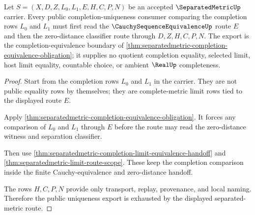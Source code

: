 \begin{theorem}
\label{thm:separatedmetric-public-completion-uniqueness-export}
Let $S=(X,D,Z,L_0,L_1,E,H,C,P,N)$ be an accepted $\SeparatedMetricUp$ carrier. Every public completion-uniqueness consumer comparing the completion rows $L_0$ and $L_1$ must first read the $\CauchySequenceEquivalenceUp$ route $E$ and then the zero-distance classifier route through $D,Z,H,C,P,N$. The export is the completion-equivalence boundary of \autoref{thm:separatedmetric-completion-equivalence-obligation}; it supplies no quotient completion equality, selected limit, host limit equality, countable choice, or ambient $\RealUp$ completeness.
\end{theorem}
\begin{proof}
Start from the completion rows $L_0$ and $L_1$ in the carrier. They are not public equality rows by themselves; they are complete-metric limit rows tied to the displayed route $E$.

Apply \autoref{thm:separatedmetric-completion-equivalence-obligation}. It forces any comparison of $L_0$ and $L_1$ through $E$ before the route may read the zero-distance witness and separation classifier.

Then use \autoref{thm:separatedmetric-completion-limit-equivalence-handoff} and \autoref{thm:separatedmetric-limit-route-scope}. These keep the completion comparison inside the finite Cauchy-equivalence and zero-distance handoff.

The rows $H,C,P,N$ provide only transport, replay, provenance, and local naming. Therefore the public uniqueness export is exhausted by the displayed separated-metric route.
\end{proof}

